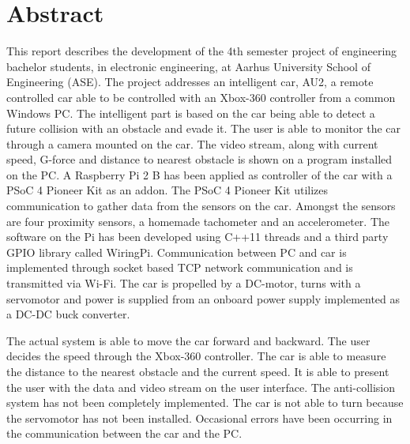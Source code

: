 \chapter{Abstract}
\label{ch:Abstract}

This report describes the development of the 4th semester project of engineering bachelor students, in electronic engineering, at Aarhus University School of Engineering (ASE).
The project addresses an intelligent car, AU2, a remote controlled car able to be controlled with an Xbox-360 controller\cite{lib:xbox-360} from a common Windows PC.
The intelligent part is based on the car being able to detect a future collision with an obstacle and evade it.
The user is able to monitor the car through a camera\cite{lib:cam} mounted on the car.
The video stream, along with current speed, G-force and distance to nearest obstacle is shown on a program installed on the PC.
A Raspberry Pi 2 B\cite{lib:rpi} has been applied as controller of the car with a PSoC 4 Pioneer Kit\cite{lib:psoc4_guide} as an addon. The PSoC 4 Pioneer Kit utilizes \IIC communication to gather data from the sensors on the car. Amongst the sensors are four proximity sensors\cite{lib:maxsonar}, a homemade tachometer and an accelerometer\cite{lib:accel}.
The software on the Pi has been developed using C++11 threads and a third party GPIO library called WiringPi\cite{lib:wiringpi}.
Communication between PC and car is implemented through socket based TCP network communication and is transmitted via Wi-Fi.
The car is propelled by a DC-motor, turns with a servomotor and power is supplied from an onboard power supply implemented as a DC-DC buck converter.

The actual system is able to move the car forward and backward. 
The user decides the speed through the Xbox-360 controller. 
The car is able to measure the distance to the nearest obstacle and the current speed. 
It is able to present the user with the data and video stream on the user interface. 
The anti-collision system has not been completely implemented. 
The car is not able to turn because the servomotor has not been installed. 
Occasional errors have been occurring in the communication between the car and the PC.

\clearpage